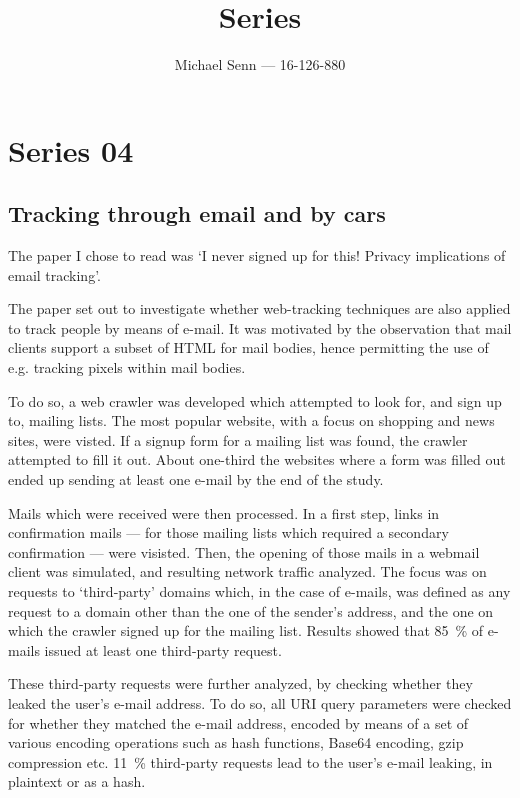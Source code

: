 \documentclass[a4paper]{scrreprt}
\title{Series \series}
\author{Michael Senn \maillink{michael.senn@students.unibe.ch} --- 16-126-880}
\date{\printdate}
\newcommand{\series}{04}
\begin{document}
\maketitle


\setcounter{chapter}{\numexpr \series - 1 \relax}

\chapter{Series \series}

\section{Tracking through email and by cars}

The paper I chose to read was `I never signed up for this! Privacy implications
of email tracking'\autocite{englehardtNeverSignedThis2018}.

The paper set out to investigate whether web-tracking techniques are also
applied to track people by means of e-mail. It was motivated by the observation
that mail clients support a subset of HTML for mail bodies, hence permitting
the use of e.g. tracking pixels within mail bodies.

To do so, a web crawler was developed which attempted to look for, and sign up
to, mailing lists. The most popular website, with a focus on shopping and news
sites, were visted. If a signup form for a mailing list was found, the crawler
attempted to fill it out. About one-third the websites where a form was filled
out ended up sending at least one e-mail by the end of the study.

Mails which were received were then processed. In a first step, links in
confirmation mails --- for those mailing lists which required a secondary
confirmation --- were visisted. Then, the opening of those mails in a webmail
client was simulated, and resulting network traffic analyzed. The focus was on
requests to `third-party' domains which, in the case of e-mails, was defined as
any request to a domain other than the one of the sender's address, and the one
on which the crawler signed up for the mailing list. Results showed that 
\SI{85}{\percent} of e-mails issued at least one third-party request.

These third-party requests were further analyzed, by checking whether they
leaked the user's e-mail address. To do so, all URI query parameters were
checked for whether they matched the e-mail address, encoded by means of a set
of various encoding operations such as hash functions, Base64 encoding, gzip
compression etc. \SI{11}{\percent} third-party requests lead to the user's
e-mail leaking, in plaintext or as a hash.
\end{document}
